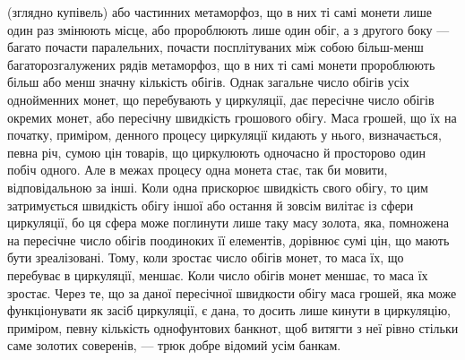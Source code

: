 \parcont{}  %
(зглядно купівель) або частинних метаморфоз, що в них ті самі
монети лише один раз змінюють місце, або пророблюють лише
один обіг, а з другого боку — багато почасти паралельних,
почасти посплітуваних між собою більш-менш багаторозгалужених
рядів метаморфоз, що в них ті самі монети пророблюють
більш або менш значну кількість обігів. Однак загальне число
обігів усіх однойменних монет, що перебувають у циркуляції,
дає пересічне число обігів окремих монет, або пересічну швидкість
грошового обігу. Маса грошей, що їх на початку, приміром,
денного процесу циркуляції кидають у нього, визначається,
певна річ, сумою цін товарів, що циркулюють одночасно й просторово
один побіч одного. Але в межах процесу одна монета
стає, так би мовити, відповідальною за інші. Коли одна прискорює
швидкість свого обігу, то цим затримується швидкість обігу
іншої або остання й зовсім вилітає із сфери циркуляції, бо ця
сфера може поглинути лише таку масу золота, яка, помножена
на пересічне число обігів поодиноких її елементів, дорівнює сумі
цін, що мають бути зреалізовані. Тому, коли зростає число обігів
монет, то маса їх, що перебуває в циркуляції, меншає. Коли
число обігів монет меншає, то маса їх зростає. Через те, що за
даної пересічної швидкости обігу маса грошей, яка може функціонувати
як засіб циркуляції, є дана, то досить лише кинути
в циркуляцію, приміром, певну кількість однофунтових банкнот,
щоб витягти з неї рівно стільки саме золотих соверенів, — трюк
добре відомий усім банкам.

